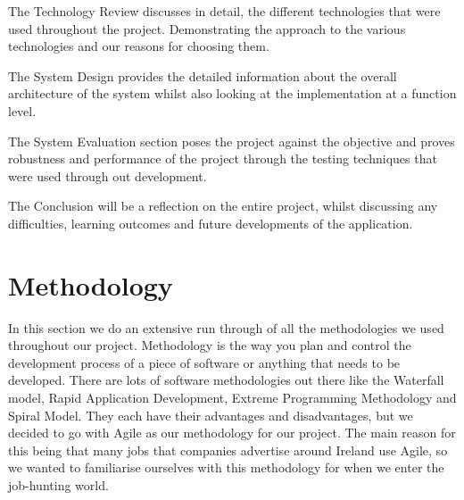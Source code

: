 The Technology Review discusses in detail, the different technologies that were used throughout the project. Demonstrating the approach to the various technologies and our reasons for choosing them.\newline

The System Design provides the detailed information about the overall architecture of the system whilst also looking at the implementation at a function level.\newline

The System Evaluation section poses the project against the objective and proves robustness and performance of the project through the testing techniques that were used through out development.\newline

The Conclusion will be a reflection on the entire project, whilst discussing any difficulties, learning outcomes and future developments of the application.

\chapter{Methodology}
In this section we do an extensive run through of all the methodologies we used throughout our project. Methodology is the way you plan and control the development process of a piece of software or anything that needs to be developed. There are lots of software methodologies out there like the Waterfall model, Rapid Application Development, Extreme Programming Methodology and Spiral Model. They each have their advantages and disadvantages, but we decided to go with Agile as our methodology for our project. The main reason for this being that many jobs that companies advertise around Ireland use Agile, so we wanted to familiarise ourselves with this methodology for when we enter the job-hunting world.

